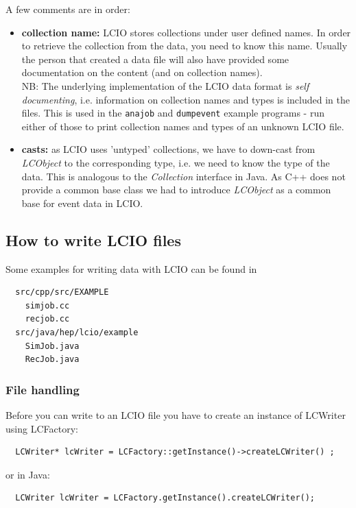 \documentclass[twoside]{article}
\begin{document}
A few comments are in order:
\begin{itemize}
\item{ {\bf collection name:} LCIO stores collections under user defined names. In order to retrieve 
the collection from the data, you need to know this name. Usually the person that created a data 
file will also have provided some documentation on the content (and on collection names). \\
NB: The underlying implementation of the LCIO data format is {\em self documenting}, i.e. information
on collection names and types is included in the files. This is used in the \verb$anajob$ and 
\verb$dumpevent$ example programs - run either of those to print collection names and 
types of an unknown LCIO file.
}

\item{ {\bf casts:} as LCIO uses 'untyped' collections, we have to down-cast from {\em LCObject} to 
the corresponding type, i.e. we need to know the type of the data. This is analogous to the 
{\em Collection} interface in Java. As C++ does not provide a common base class we had to 
introduce {\em LCObject} as a common base for event data in LCIO.
}

\end {itemize}


\subsection{How to write LCIO files}

Some examples for writing data with LCIO can be found in
\begin{verbatim}
  src/cpp/src/EXAMPLE
    simjob.cc
    recjob.cc
  src/java/hep/lcio/example
    SimJob.java
    RecJob.java
\end{verbatim}

\subsubsection{File handling}
Before you can write to an LCIO file you have to create an instance of LCWriter using LCFactory:

\begin{verbatim}
  LCWriter* lcWriter = LCFactory::getInstance()->createLCWriter() ;
\end{verbatim}
or in Java:
\begin{verbatim}
  LCWriter lcWriter = LCFactory.getInstance().createLCWriter();
\end{verbatim}
\end{document}

